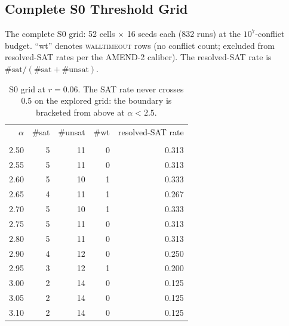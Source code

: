 \documentclass[pdflatex,sn-basic,Numbered]{sn-jnl}
\begin{document}
\begin{appendices}

\section{Complete S0 Threshold Grid}
\label{app:s0grid}

The complete S0 grid: 52 cells $\times$ 16 seeds each (832 runs) at the
$10^7$-conflict budget. ``wt'' denotes \textsc{walltimeout} rows (no conflict
count; excluded from resolved-SAT rates per the AMEND-2 caliber). The
resolved-SAT rate is $\#\text{sat}/(\#\text{sat}+\#\text{unsat})$.

\begin{table}[h]
\centering
\caption{S0 grid at $r=0.06$. The SAT rate never crosses 0.5 on the explored
grid: the boundary is bracketed from above at $\alpha<2.5$.}
\begin{tabular}{rrrrr}
\toprule
$\alpha$ & \#sat & \#unsat & \#wt & resolved-SAT rate\\
\addlinespace
\multicolumn{5}{l}{\emph{$r=0.06$ (12 cells; boundary bracketed below 2.5)}}\\
2.50 & 5 & 11 & 0 & 0.313\\
2.55 & 5 & 11 & 0 & 0.313\\
2.60 & 5 & 10 & 1 & 0.333\\
2.65 & 4 & 11 & 1 & 0.267\\
2.70 & 5 & 10 & 1 & 0.333\\
2.75 & 5 & 11 & 0 & 0.313\\
2.80 & 5 & 11 & 0 & 0.313\\
2.90 & 4 & 12 & 0 & 0.250\\
2.95 & 3 & 12 & 1 & 0.200\\
3.00 & 2 & 14 & 0 & 0.125\\
3.05 & 2 & 14 & 0 & 0.125\\
3.10 & 2 & 14 & 0 & 0.125\\
\bottomrule
\end{tabular}

\label{tab:s0r006}
\end{table}


\end{appendices}
\end{document}
